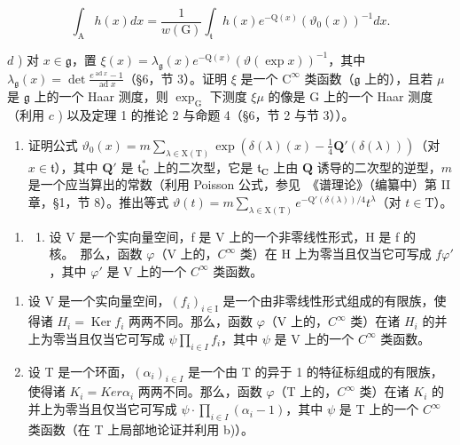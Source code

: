 \begin{enumerate}
\[
\int_ {\mathrm{A}} h (x) d x = \frac {1}{w (\mathrm{G})} \int_ {\mathfrak {t}} h (x) e ^ {- \mathrm{Q} (x)} (\vartheta_ {0} (x)) ^ {- 1} d x.
\]

\(d\) ) 对 \(x\in \mathfrak{g}\)，置 \(\xi (x) = \lambda_{\mathfrak{g}}(x)e^{-\mathrm{Q}(x)}(\vartheta (\exp x))^{-1}\)，其中 \(\lambda_{\mathfrak{g}}(x) = \det \frac{e^{\operatorname*{ad}x} - 1}{\operatorname*{ad}x}\)（§6，节 3）。证明 \(\xi\) 是一个 \(\mathrm{C}^\infty\) 类函数（\(\mathfrak{g}\) 上的），且若 \(\mu\) 是 \(\mathfrak{g}\) 上的一个 Haar 测度，则 \(\exp_{\mathrm{G}}\) 下测度 \(\xi \mu\) 的像是 G 上的一个 Haar 测度（利用 \(c\) ) 以及定理 1 的推论 2 与命题 4（§6，节 2 与节 3））。

\begin{enumerate}
\def\labelenumi{\alph{enumi})}
\setcounter{enumi}{4}
\tightlist
\item
  证明公式 \(\vartheta_0(x) = m\sum_{\lambda \in \mathrm{X(T)}}\exp (\delta (\lambda)(x) - \frac{1}{4}\mathbf{Q}'(\delta (\lambda)))\)（对 \(x\in \mathfrak{t}\)），其中 \(\mathbf{Q}'\) 是 \(\mathfrak{t}_{\mathbf{C}}^{*}\) 上的二次型，它是 \(\mathfrak{t}_{\mathbf{C}}\) 上由 \(\mathbf{Q}\) 诱导的二次型的逆型，\(m\) 是一个应当算出的常数（利用 Poisson 公式，参见~《谱理论》（编纂中）第 II 章，§1，节 8）。推出等式 \(\vartheta (t) = m\sum_{\lambda \in \mathrm{X(T)}}e^{-\mathrm{Q}'(\delta (\lambda)) / 4}t^{\lambda}\)（对 \(t\in \mathrm{T}\)）。
\end{enumerate}

\begin{enumerate}
\def\labelenumi{\arabic{enumi})}
\setcounter{enumi}{4}
\tightlist
\item
  \begin{enumerate}
  \def\labelenumii{\alph{enumii})}
  \tightlist
  \item
    设 V 是一个实向量空间，f 是 V 上的一个非零线性形式，H 是 f 的核。~那么，函数 \(\varphi\)（V 上的，\(C^{\infty}\) 类）在 H 上为零当且仅当它可写成 \(f\varphi'\)，其中 \(\varphi'\) 是 V 上的一个 \(C^{\infty}\) 类函数。
  \end{enumerate}
\end{enumerate}

\begin{enumerate}
\def\labelenumi{\alph{enumi})}
\setcounter{enumi}{1}
\item
  设 V 是一个实向量空间，\((f_{i})_{i\in\mathrm{I}}\) 是一个由非零线性形式组成的有限族，使得诸 \(H_{i}=\operatorname{Ker}f_{i}\) 两两不同。那么，函数 \(\varphi\)（V 上的，\(C^{\infty}\) 类）在诸 \(H_{i}\) 的并上为零当且仅当它可写成 \(\psi\prod_{i\in I}f_{i}\)，其中 \(\psi\) 是 V 上的一个 \(C^{\infty}\) 类函数。
\item
  设 T 是一个环面，\((\alpha_{i})_{i\in I}\) 是一个由 T 的异于 1 的特征标组成的有限族，使得诸 \(K_{i} = Ker \alpha_{i}\) 两两不同。那么，函数 \(\varphi\)（T 上的，\(C^{\infty}\) 类）在诸 \(K_{i}\) 的并上为零当且仅当它可写成 \(\psi \cdot \prod_{i\in I}(\alpha_{i}-1)\)，其中 \(\psi\) 是 T 上的一个 \(C^{\infty}\) 类函数（在 T 上局部地论证并利用 b)）。
\end{enumerate}


\end{enumerate}
